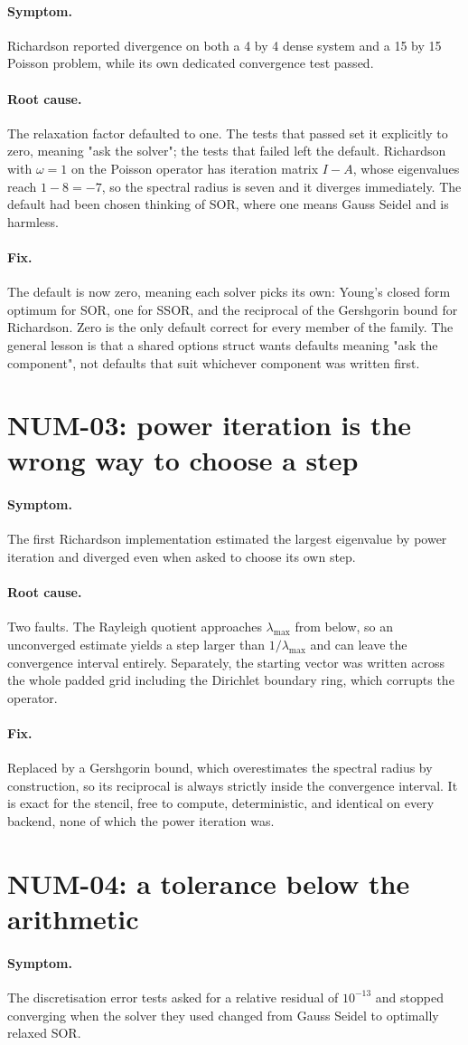 \documentclass[11pt,a4paper]{report}
\newcommand{\symptom}[1]{\paragraph{Symptom.}#1}
\newcommand{\rootcause}[1]{\paragraph{Root cause.}#1}
\newcommand{\fix}[1]{\paragraph{Fix.}#1}
\begin{document}
\symptom{Richardson reported divergence on both a 4 by 4 dense system and a 15 by
15 Poisson problem, while its own dedicated convergence test passed.}

\rootcause{The relaxation factor defaulted to one. The tests that passed set it
explicitly to zero, meaning "ask the solver"; the tests that failed left the
default. Richardson with $\omega = 1$ on the Poisson operator has iteration
matrix $I - A$, whose eigenvalues reach $1 - 8 = -7$, so the spectral radius is
seven and it diverges immediately. The default had been chosen thinking of SOR,
where one means Gauss Seidel and is harmless.}

\fix{The default is now zero, meaning each solver picks its own: Young's closed
form optimum for SOR, one for SSOR, and the reciprocal of the Gershgorin bound
for Richardson. Zero is the only default correct for every member of the family.
The general lesson is that a shared options struct wants defaults meaning "ask
the component", not defaults that suit whichever component was written first.}

\section{NUM-03: power iteration is the wrong way to choose a step}

\symptom{The first Richardson implementation estimated the largest eigenvalue by
power iteration and diverged even when asked to choose its own step.}

\rootcause{Two faults. The Rayleigh quotient approaches $\lambda_{\max}$ from
below, so an unconverged estimate yields a step larger than
$1/\lambda_{\max}$ and can leave the convergence interval entirely. Separately,
the starting vector was written across the whole padded grid including the
Dirichlet boundary ring, which corrupts the operator.}

\fix{Replaced by a Gershgorin bound, which overestimates the spectral radius by
construction, so its reciprocal is always strictly inside the convergence
interval. It is exact for the stencil, free to compute, deterministic, and
identical on every backend, none of which the power iteration was.}

\section{NUM-04: a tolerance below the arithmetic}

\symptom{The discretisation error tests asked for a relative residual of
$10^{-13}$ and stopped converging when the solver they used changed from Gauss
Seidel to optimally relaxed SOR.}
\end{document}
